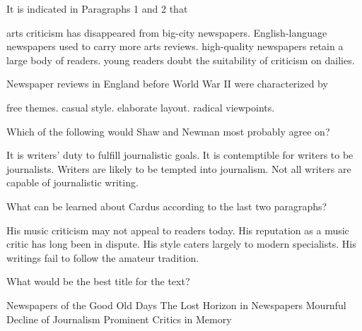 \item It is indicated in Paragraphs 1 and 2 that
\begin{tasks}
	\task arts criticism has disappeared from big-city newspapers.
	\task English-language newspapers used to carry more arts reviews.
	\task high-quality newspapers retain a large body of readers.
	\task young readers doubt the suitability of criticism on dailies.
\end{tasks}
\item Newspaper reviews in England before World War II were characterized by
\begin{tasks}
	\task free themes.
	\task casual style.
	\task elaborate layout.
	\task radical viewpoints.
\end{tasks}
\item Which of the following would Shaw and Newman most probably agree on?
\begin{tasks}
	\task It is writers' duty to fulfill journalistic goals.
	\task It is contemptible for writers to be journalists.
	\task Writers are likely to be tempted into journalism.
	\task Not all writers are capable of journalistic writing.
\end{tasks}
\item What can be learned about Cardus according to the last two paragraphs?
\begin{tasks}
	\task His music criticism may not appeal to readers today.
	\task His reputation as a music critic has long been in dispute.
	\task His style caters largely to modern specialists.
	\task His writings fail to follow the amateur tradition.
\end{tasks}
\item What would be the best title for the text?
\begin{tasks}
	\task Newspapers of the Good Old Days
	\task The Lost Horizon in Newspapers
	\task Mournful Decline of Journalism
	\task Prominent Critics in Memory
\end{tasks}
